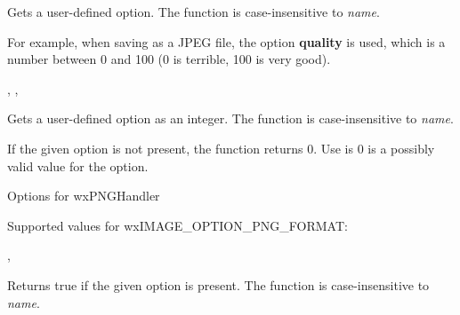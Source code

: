 
Gets a user-defined option. The function is case-insensitive to {\it name}.

For example, when saving as a JPEG file, the option {\bf quality} is
used, which is a number between 0 and 100 (0 is terrible, 100 is very good).


,\rtfsp
{},\rtfsp
{}


\label{wximagegetoptionint}


Gets a user-defined option as an integer. The function is case-insensitive to {\it name}.

If the given option is not present, the function returns $0$. Use
 is $0$ is a possibly valid value
for the option.

Options for wxPNGHandler
\twocolwidtha{5cm}%
\begin{twocollist}
\end{twocollist}

Supported values for wxIMAGE\_OPTION\_PNG\_FORMAT:
\twocolwidtha{5cm}%
\begin{twocollist}
\end{twocollist}



,\rtfsp
{}


\label{wximagehasoption}


Returns true if the given option is present. The function is case-insensitive to {\it name}.


